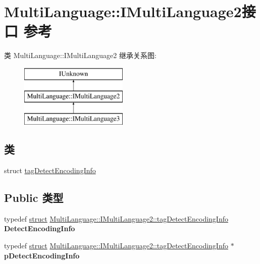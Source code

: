 \hypertarget{interface_multi_language_1_1_i_multi_language2}{}\section{Multi\+Language\+:\+:I\+Multi\+Language2接口 参考}
\label{interface_multi_language_1_1_i_multi_language2}
类 Multi\+Language\+:\+:I\+Multi\+Language2 继承关系图\+:\begin{figure}[H]
\begin{center}
\leavevmode
\includegraphics[height=3.000000cm]{interface_multi_language_1_1_i_multi_language2}
\end{center}
\end{figure}
\subsection*{类}
\begin{DoxyCompactItemize}
\item 
struct \hyperlink{struct_multi_language_1_1_i_multi_language2_1_1tag_detect_encoding_info}{tag\+Detect\+Encoding\+Info}
\end{DoxyCompactItemize}
\subsection*{Public 类型}
\begin{DoxyCompactItemize}
\item 
\mbox{\label{interface_multi_language_1_1_i_multi_language2_a22224c8ebe2ea58a9cdd4a16adfb7ee3}} 
typedef \hyperlink{interfacestruct}{struct} \hyperlink{struct_multi_language_1_1_i_multi_language2_1_1tag_detect_encoding_info}{Multi\+Language\+::\+I\+Multi\+Language2\+::tag\+Detect\+Encoding\+Info} {\bfseries Detect\+Encoding\+Info}
\item 
\mbox{\label{interface_multi_language_1_1_i_multi_language2_a4c594a7551f64981a0512497291f3799}} 
typedef \hyperlink{interfacestruct}{struct} \hyperlink{struct_multi_language_1_1_i_multi_language2_1_1tag_detect_encoding_info}{Multi\+Language\+::\+I\+Multi\+Language2\+::tag\+Detect\+Encoding\+Info} $\ast$ {\bfseries p\+Detect\+Encoding\+Info}
\end{DoxyCompactItemize}
